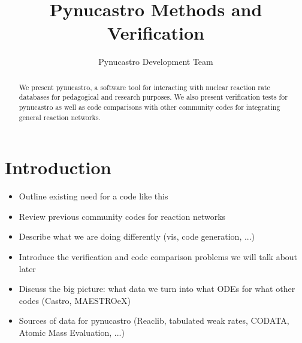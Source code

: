 \documentclass[preprint,times,tighten]{aastex63}
\begin{document}
\title{Pynucastro Methods and Verification}


\author[0000-0000-0000-0000]{Pynucastro Development Team}



\begin{abstract}
We present pynucastro, a software tool for interacting with nuclear
reaction rate databases for pedagogical and research purposes. We
also present verification tests for pynucastro as well as code
comparisons with other community codes for integrating general
reaction networks.
\end{abstract}


\section{Introduction}\label{Sec:Introduction}

\begin{itemize}
    \item Outline existing need for a code like this
    \item Review previous community codes for reaction networks
    \item Describe what we are doing differently (vis, code generation, ...)
    \item Introduce the verification and code comparison problems we will talk about later
    \item Discuss the big picture: what data we turn into what ODEs for what other codes (Castro, MAESTROeX)
    \item Sources of data for pynucastro (Reaclib, tabulated weak rates, CODATA, Atomic Mass Evaluation, ...)
\end{itemize}
\end{document}
